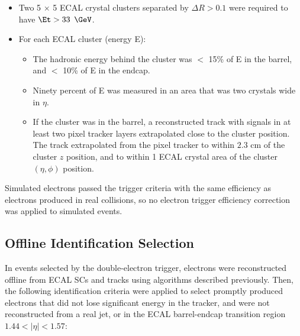 \begin{itemize}
	\item Two 5 $\times$ 5 ECAL crystal clusters separated by $\Delta R > 0.1$ were required to have $\Et > 33$ $\GeV$.
	\item For each ECAL cluster (energy E):
	\begin{itemize}
		\item The hadronic energy behind the cluster was $<$ 15\% of E in the barrel, and $<$ 10\% of E in the endcap. 
		\item Ninety percent of E was measured in an area that was two crystals wide in $\eta$.
		\item If the cluster was in the barrel, a reconstructed track with signals in at least two pixel tracker layers 
			extrapolated close to the cluster position.  The track extrapolated from the pixel tracker to within $2.3$ cm 
			of the cluster $z$ position, and to within 1 ECAL crystal area of the cluster $(\eta,\phi)$ position.
	\end{itemize}
\end{itemize}

Simulated electrons passed the trigger criteria with the same efficiency as electrons produced in real collisions, so no electron 
trigger efficiency correction was applied to simulated events.

\subsection{Offline Identification Selection}
In events selected by the double-electron trigger, electrons were reconstructed offline from ECAL SCs and tracks using algorithms 
described previously.  Then, the following identification criteria were applied to select promptly produced 
electrons that did not lose significant energy in the tracker, and were not reconstructed from a real jet, or in the ECAL barrel-endcap 
transition region $1.44 < |\eta| < 1.57$:

